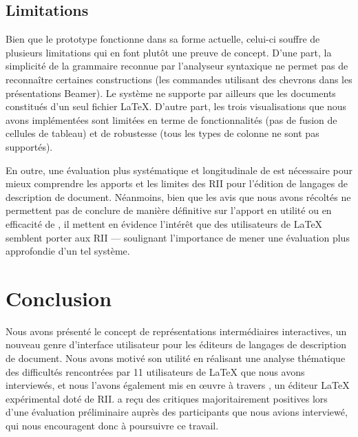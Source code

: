 \subsection{Limitations}
Bien que le prototype fonctionne dans sa forme actuelle, celui-ci souffre de plusieurs limitations qui en font plutôt une preuve de concept.
D'une part, la simplicité de la grammaire reconnue par l'analyseur syntaxique ne permet pas de reconnaître certaines constructions (\eg les commandes utilisant des chevrons dans les présentations Beamer).
Le système ne supporte par ailleurs que les documents constitués d'un seul fichier \LaTeX{}.
D'autre part, les trois visualisations que nous avons implémentées sont limitées en terme de fonctionnalités (\eg pas de fusion de cellules de tableau) et de robustesse (\eg tous les types de colonne ne sont pas supportés).

En outre, une évaluation plus systématique et longitudinale de \iLaTeX{} est nécessaire pour mieux comprendre les apports et les limites des RII pour l'édition de langages de description de document.
Néanmoins, bien que les avis que nous avons récoltés ne permettent pas de conclure de manière définitive sur l'apport en utilité ou en efficacité de \iLaTeX{}, il mettent en évidence l'intérêt que des utilisateurs de \LaTeX{} semblent porter aux RII --- soulignant l'importance de mener une évaluation plus approfondie d'un tel système.





\section{Conclusion}
\label{sec:conclusion}

Nous avons présenté le concept de représentations intermédiaires interactives, un nouveau genre d'interface utilisateur pour les éditeurs de langages de description de document.
Nous avons motivé son utilité en réalisant une analyse thématique des difficultés rencontrées par 11 utilisateurs de \LaTeX{} que nous avons interviewés, et nous l'avons également mis en œuvre à travers \iLaTeX{}, un éditeur \LaTeX{} expérimental doté de RII.
\iLaTeX{} a reçu des critiques majoritairement positives lors d'une évaluation préliminaire auprès des participants que nous avions interviewé, qui nous encouragent donc à poursuivre ce travail.

